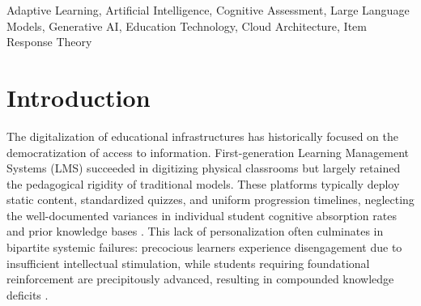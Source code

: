 \documentclass[conference]{IEEEtran}
\begin{document}
\begin{abstract}
The paradigm of contemporary education is witnessing a fundamental transformation, propelled by the integration of sophisticated computational frameworks and artificial intelligence. While conventional learning management systems primarily deliver static curricula, they inherently fail to address the idiosyncratic cognitive trajectories of individual learners. This manuscript details the design, architectural deployment, and empirical evaluation of EDULEARN, a highly scalable, AI-powered educational ecosystem. By harnessing the generative capabilities of Large Language Models (LLMs)---specifically Google Gemini---the platform orchestrates real-time, adaptive cognitive assessments tailored to a student's evolving proficiency. The underlying infrastructure employs an asynchronous FastAPI microservices architecture, a React-based interactive frontend, and a secure, HackerEarth-backed sandboxed execution environment for programmatic assessments. Our proposed Adaptive Engine utilizes continuous performance data to recalibrate the difficulty gradient of subsequent educational materials dynamically. Empirical evaluations conducted on a cohort of undergraduate students indicate a marked improvement in both engagement metrics and knowledge retention when juxtaposed with static learning environments. Furthermore, the automation of content generation significantly attenuates the administrative overhead for educators. We elucidate the systemic architecture, delve into the mathematical formulations governing the adaptive logic, and present comprehensive performance analyses encompassing algorithmic complexity and systemic reliability.
\end{abstract}

\begin{IEEEkeywords}
Adaptive Learning, Artificial Intelligence, Cognitive Assessment, Large Language Models, Generative AI, Education Technology, Cloud Architecture, Item Response Theory
\end{IEEEkeywords}

\section{Introduction}
The digitalization of educational infrastructures has historically focused on the democratization of access to information. First-generation Learning Management Systems (LMS) succeeded in digitizing physical classrooms but largely retained the pedagogical rigidity of traditional models. These platforms typically deploy static content, standardized quizzes, and uniform progression timelines, neglecting the well-documented variances in individual student cognitive absorption rates and prior knowledge bases \cite{smith2020adaptive}. This lack of personalization often culminates in bipartite systemic failures: precocious learners experience disengagement due to insufficient intellectual stimulation, while students requiring foundational reinforcement are precipitously advanced, resulting in compounded knowledge deficits \cite{johnson2021ai}.
\end{document}
